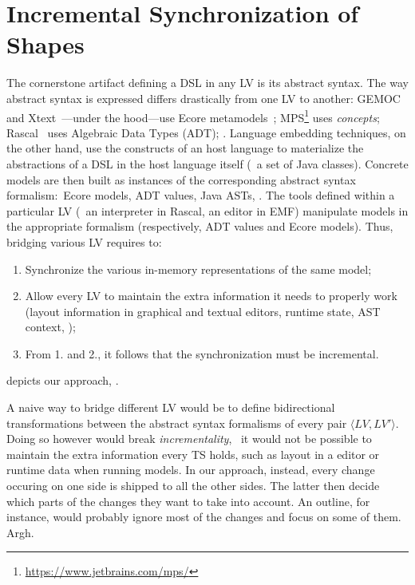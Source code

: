 \section{Incremental Synchronization of Shapes}


The cornerstone artifact defining a DSL in any LV is its abstract syntax.
The way abstract syntax is expressed differs drastically from one LV to another: GEMOC~\cite{bousse2016execution} and Xtext~\cite{bettini2016implementing}---under the hood---use Ecore metamodels~\cite{steinberg2008emf}; MPS\footnote{\url{https://www.jetbrains.com/mps/}} uses \emph{concepts}; Rascal~\cite{klint2010easy} uses Algebraic Data Types (ADT); \etc.
Language embedding techniques, on the other hand, use the constructs of an host language to materialize the abstractions of a DSL in the host language itself (\eg~a set of Java classes).
Concrete models are then built as instances of the corresponding abstract syntax formalism:~Ecore models, ADT values, Java ASTs, \etc.
The tools defined within a particular LV (\eg~an interpreter in Rascal, an editor in EMF) manipulate models in the appropriate formalism (respectively, ADT values and Ecore models).
Thus, bridging various LV requires to:
\begin{enumerate}
	\item Synchronize the various in-memory representations of the same model;
	\item Allow every LV to maintain the extra information it needs to properly work (layout information in graphical and textual editors, runtime state, AST context, \etc);
	\item From 1. and 2., it follows that the synchronization must be incremental.
\end{enumerate}

 depicts our approach, \prism.

A naive way to bridge different LV would be to define bidirectional transformations between the abstract syntax formalisms of every pair $\langle LV, LV' \rangle$.
Doing so however would break \emph{incrementality}, \ie~it would not be possible to maintain the extra information every TS holds, such as layout in a editor or runtime data when running models.
In our approach, instead, every change occuring on one side is shipped to all the other sides.
The latter then decide which parts of the changes they want to take into account.
An outline, for instance, would probably ignore most of the changes and focus on some of them. Argh.

